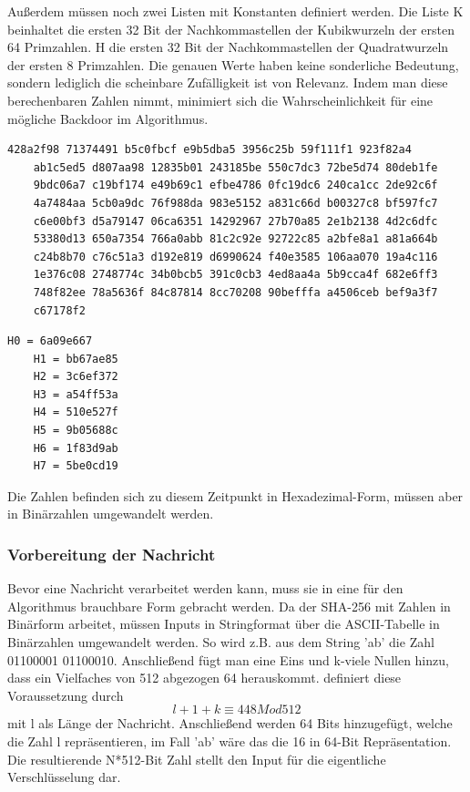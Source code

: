 Außerdem müssen noch zwei Listen mit Konstanten definiert werden. Die Liste K beinhaltet die ersten 32 Bit der Nachkommastellen der Kubikwurzeln der ersten 64 Primzahlen.
H die ersten 32 Bit der Nachkommastellen der Quadratwurzeln der ersten 8 Primzahlen. 
 Die genauen Werte haben keine sonderliche Bedeutung, sondern lediglich die scheinbare Zufälligkeit ist von Relevanz. Indem man diese berechenbaren Zahlen nimmt, minimiert sich die Wahrscheinlichkeit für eine mögliche Backdoor im Algorithmus.
\begin{lstlisting}[caption={Liste K von Konstanten},captionpos=b]
	428a2f98 71374491 b5c0fbcf e9b5dba5 3956c25b 59f111f1 923f82a4 
	ab1c5ed5 d807aa98 12835b01 243185be 550c7dc3 72be5d74 80deb1fe 
	9bdc06a7 c19bf174 e49b69c1 efbe4786 0fc19dc6 240ca1cc 2de92c6f 
	4a7484aa 5cb0a9dc 76f988da 983e5152 a831c66d b00327c8 bf597fc7
	c6e00bf3 d5a79147 06ca6351 14292967 27b70a85 2e1b2138 4d2c6dfc
	53380d13 650a7354 766a0abb 81c2c92e 92722c85 a2bfe8a1 a81a664b 
	c24b8b70 c76c51a3 d192e819 d6990624 f40e3585 106aa070 19a4c116 
	1e376c08 2748774c 34b0bcb5 391c0cb3 4ed8aa4a 5b9cca4f 682e6ff3 
	748f82ee 78a5636f 84c87814 8cc70208 90befffa a4506ceb bef9a3f7 
	c67178f2
\end{lstlisting}
\begin{lstlisting}[caption={Liste H mit den Arbeitsvariablen H0 - H7},captionpos=b]
	H0 = 6a09e667
	H1 = bb67ae85
	H2 = 3c6ef372
	H3 = a54ff53a
	H4 = 510e527f
	H5 = 9b05688c
	H6 = 1f83d9ab
	H7 = 5be0cd19
\end{lstlisting}
Die Zahlen befinden sich zu diesem Zeitpunkt in Hexadezimal-Form, müssen aber in Binärzahlen umgewandelt werden.
\subsubsection{Vorbereitung der Nachricht}
Bevor eine Nachricht verarbeitet werden kann, muss sie in eine für den Algorithmus brauchbare Form gebracht werden. 
Da der SHA-256 mit Zahlen in Binärform arbeitet, müssen Inputs in Stringformat über die ASCII-Tabelle in Binärzahlen umgewandelt werden. So wird z.B. aus dem String 'ab' die Zahl 01100001 01100010.
Anschließend fügt man eine Eins und k-viele Nullen hinzu, dass ein Vielfaches von 512 abgezogen 64 herauskommt. \cite{dang_2015} definiert diese Voraussetzung durch
$$l+1+k \equiv 448 Mod512$$
mit l als Länge der Nachricht. Anschließend werden 64 Bits hinzugefügt, welche die Zahl l repräsentieren, im Fall 'ab' wäre das die 16 in 64-Bit Repräsentation. Die resultierende N*512-Bit Zahl stellt den Input für die eigentliche Verschlüsselung dar.


